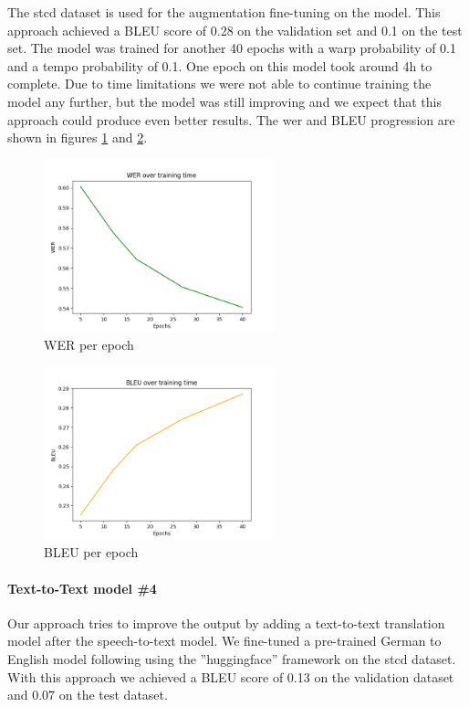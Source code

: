 The \gls{stcd} dataset is used for the augmentation fine-tuning on the  model. This approach achieved a BLEU score of 0.28 on the validation set and 0.1 on the test set. The model was trained for another
40 epochs with a warp probability of 0.1 and a tempo probability of 0.1. One epoch on this model took around 4h to complete. Due to time limitations we
were not able to continue training the model any further, but the model was still improving and we expect that this approach could produce even better results. The \gls{wer} and BLEU progression are shown in figures \ref{fig:WER} and  \ref{fig:BLEU}.
\begin{figure}[t]
    \includegraphics[width=\linewidth,height=5cm]{img/WER.png}
    \caption{WER per epoch}
    \label{fig:WER}
\end{figure}
\begin{figure}[t]
    \includegraphics[width=\linewidth,height=5cm]{img/BLEU.png}
    \caption{BLEU per epoch}
    \label{fig:BLEU}
\end{figure}

\paragraph{Text-to-Text model \#4} Our  approach tries to improve the output by adding a text-to-text translation model after the speech-to-text model. We fine-tuned a pre-trained German to
English model following  using the ''huggingface'' framework \cite{wolf-etal-2020-transformers} on the \gls{stcd} dataset. With this approach we achieved a BLEU score of 0.13 on the validation dataset and
0.07 on the test dataset.
